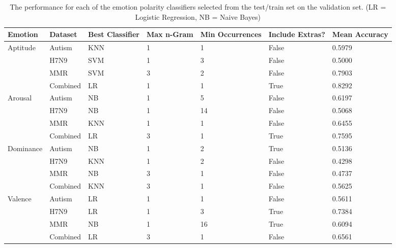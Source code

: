 \begin{table}[]
\centering
\begin{tabular}{|l|l|l|p{1.15cm}|p{1.4cm}|p{1.5cm}|p{1.25cm}|}
\hline
Emotion                    & Dataset  & Best Classifier     & Max n-Gram & Min Occurrences & Include Extras? & Mean Accuracy \\ \hline
\multirow{4}{*}{Aptitude}  & Autism   & KNN                 & 1          & 1               & False           & 0.5979 \\ \cline{2-7} 
                           & H7N9     & SVM                 & 1          & 3               & False           & 0.5000           \\ \cline{2-7} 
                           & MMR      & SVM                 & 3          & 2               & False           & 0.7903   \\ \cline{2-7} 
                           & Combined & LR & 1          & 1               & True            & 0.8292  \\ \hline
\multirow{4}{*}{Arousal}   & Autism   & NB         & 1          & 5               & False           & 0.6197  \\ \cline{2-7} 
                           & H7N9     & NB         & 1          & 14              & False           & 0.5068 \\ \cline{2-7} 
                           & MMR      & KNN                 & 1          & 1               & False           & 0.6455  \\ \cline{2-7} 
                           & Combined & LR & 3          & 1               & True            & 0.7595 \\ \hline
\multirow{4}{*}{Dominance} & Autism   & NB         & 1          & 2               & True            & 0.5136 \\ \cline{2-7} 
                           & H7N9     & KNN                 & 1          & 2               & False           & 0.4298  \\ \cline{2-7} 
                           & MMR      & NB         & 3          & 1               & False           & 0.4737  \\ \cline{2-7} 
                           & Combined & KNN                 & 3          & 1               & False           & 0.5625        \\ \hline
\multirow{4}{*}{Valence}   & Autism   & LR & 1          & 1               & False           & 0.5611  \\ \cline{2-7} 
                           & H7N9     & LR & 1          & 3               & True            & 0.7384   \\ \cline{2-7} 
                           & MMR      & NB         & 1          & 16              & True            & 0.6094      \\ \cline{2-7} 
                           & Combined & LR & 3          & 1               & False           & 0.6561  \\ \hline
\end{tabular}
\caption{The performance for each of the emotion polarity classifiers selected from the test/train set on the validation set. (LR = Logistic Regression, NB = Naive Bayes)}
\label{tab:emotionperformancepolarity}
\end{table}

